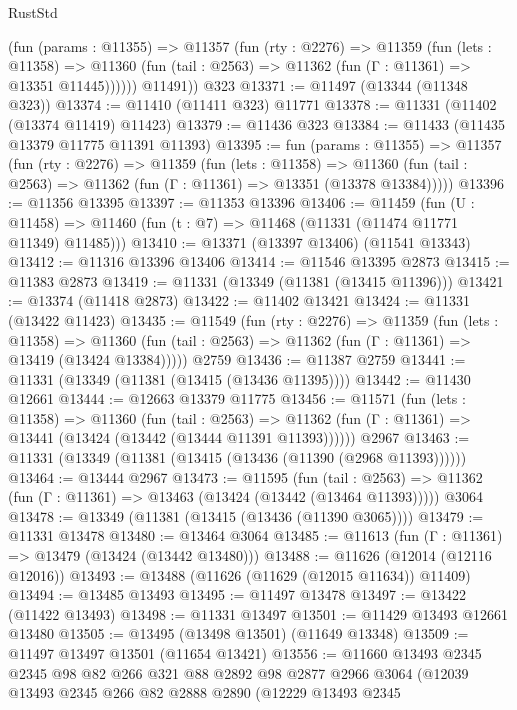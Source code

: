 \begin{lexlean}{RustStd}
\begin{coremodule}
          (fun (params : @11355) =>
          @11357
            (fun (rty : @2276) =>
            @11359
              (fun (lets : @11358) =>
              @11360 (fun (tail : @2563) => @11362 (fun (Γ : @11361) => @13351 @11445))))))
        @11491))
    @323
@13371 := @11497 (@13344 (@11348 @323))
@13374 := @11410 (@11411 @323) @11771
@13378 := @11331 (@11402 (@13374 @11419) @11423)
@13379 := @11436 @323
@13384 := @11433 (@11435 @13379 @11775 @11391 @11393)
@13395 := fun (params : @11355) =>
  @11357
    (fun (rty : @2276) =>
    @11359
      (fun (lets : @11358) =>
      @11360 (fun (tail : @2563) => @11362 (fun (Γ : @11361) => @13351 (@13378 @13384)))))
@13396 := @11356 @13395
@13397 := @11353 @13396
@13406 := @11459
    (fun (U : @11458) => @11460 (fun (t : @7) => @11468 (@11331 (@11474 @11771 @11349) @11485)))
@13410 := @13371 (@13397 @13406) (@11541 @13343)
@13412 := @11316 @13396 @13406
@13414 := @11546 @13395 @2873
@13415 := @11383 @2873
@13419 := @11331 (@13349 (@11381 (@13415 @11396)))
@13421 := @13374 (@11418 @2873)
@13422 := @11402 @13421
@13424 := @11331 (@13422 @11423)
@13435 := @11549
    (fun (rty : @2276) =>
    @11359
      (fun (lets : @11358) =>
      @11360 (fun (tail : @2563) => @11362 (fun (Γ : @11361) => @13419 (@13424 @13384)))))
    @2759
@13436 := @11387 @2759
@13441 := @11331 (@13349 (@11381 (@13415 (@13436 @11395))))
@13442 := @11430 @12661
@13444 := @12663 @13379 @11775
@13456 := @11571
    (fun (lets : @11358) =>
    @11360
      (fun (tail : @2563) =>
      @11362 (fun (Γ : @11361) => @13441 (@13424 (@13442 (@13444 @11391 @11393))))))
    @2967
@13463 := @11331 (@13349 (@11381 (@13415 (@13436 (@11390 (@2968 @11393))))))
@13464 := @13444 @2967
@13473 := @11595
    (fun (tail : @2563) => @11362 (fun (Γ : @11361) => @13463 (@13424 (@13442 (@13464 @11393)))))
    @3064
@13478 := @13349 (@11381 (@13415 (@13436 (@11390 @3065))))
@13479 := @11331 @13478
@13480 := @13464 @3064
@13485 := @11613 (fun (Γ : @11361) => @13479 (@13424 (@13442 @13480)))
@13488 := @11626 (@12014 (@12116 @12016))
@13493 := @13488 (@11626 (@11629 (@12015 @11634)) @11409)
@13494 := @13485 @13493
@13495 := @11497 @13478
@13497 := @13422 (@11422 @13493)
@13498 := @11331 @13497
@13501 := @11429 @13493 @12661 @13480
@13505 := @13495 (@13498 @13501) (@11649 @13348)
@13509 := @11497 @13497 @13501 (@11654 @13421)
@13556 := @11660
    @13493
    @2345
    @2345
    @98
    @82
    @266
    @321
    @88
    @2892
    @98
    @2877
    @2966
    @3064
    (@12039
      @13493
      @2345
      @266
      @82
      @2888
      @2890
      (@12229
        @13493
        @2345

\end{coremodule}
\end{lexlean}
